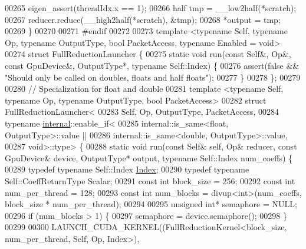 \begin{DoxyCode}
00265   eigen\_assert(threadIdx.x == 1);
00266   half tmp = \_\_low2half(*scratch);
00267   reducer.reduce(\_\_high2half(*scratch), &tmp);
00268   *output = tmp;
00269 \}
00270 
00271 \textcolor{preprocessor}{#endif}
00272 
00273 \textcolor{keyword}{template} <\textcolor{keyword}{typename} Self, \textcolor{keyword}{typename} Op, \textcolor{keyword}{typename} OutputType, \textcolor{keywordtype}{bool} PacketAccess, \textcolor{keyword}{typename} Enabled = \textcolor{keywordtype}{void}>
00274 \textcolor{keyword}{struct }FullReductionLauncher \{
00275   \textcolor{keyword}{static} \textcolor{keywordtype}{void} run(\textcolor{keyword}{const} Self&, Op&, \textcolor{keyword}{const} GpuDevice&, OutputType*, \textcolor{keyword}{typename} Self::Index) \{
00276     assert(\textcolor{keyword}{false} && \textcolor{stringliteral}{"Should only be called on doubles, floats and half floats"});
00277   \}
00278 \};
00279 
00280 \textcolor{comment}{// Specialization for float and double}
00281 \textcolor{keyword}{template} <\textcolor{keyword}{typename} Self, \textcolor{keyword}{typename} Op, \textcolor{keyword}{typename} OutputType, \textcolor{keywordtype}{bool} PacketAccess>
00282 \textcolor{keyword}{struct }FullReductionLauncher<
00283     Self, Op, OutputType, PacketAccess,
00284     typename \hyperlink{namespaceinternal}{internal}::enable\_if<
00285       internal::is\_same<float, OutputType>::value ||
00286       internal::is\_same<double, OutputType>::value,
00287     void>::type> \{
00288   \textcolor{keyword}{static} \textcolor{keywordtype}{void} run(\textcolor{keyword}{const} Self& \textcolor{keyword}{self}, Op& reducer, \textcolor{keyword}{const} GpuDevice& device, OutputType* output, \textcolor{keyword}{typename} 
      Self::Index num\_coeffs) \{
00289     \textcolor{keyword}{typedef} \textcolor{keyword}{typename} Self::Index \hyperlink{namespace_eigen_a62e77e0933482dafde8fe197d9a2cfde}{Index};
00290     \textcolor{keyword}{typedef} \textcolor{keyword}{typename} Self::CoeffReturnType Scalar;
00291     \textcolor{keyword}{const} \textcolor{keywordtype}{int} block\_size = 256;
00292     \textcolor{keyword}{const} \textcolor{keywordtype}{int} num\_per\_thread = 128;
00293     \textcolor{keyword}{const} \textcolor{keywordtype}{int} num\_blocks = divup<int>(num\_coeffs, block\_size * num\_per\_thread);
00294 
00295     \textcolor{keywordtype}{unsigned} \textcolor{keywordtype}{int}* semaphore = NULL;
00296     \textcolor{keywordflow}{if} (num\_blocks > 1) \{
00297       semaphore = device.semaphore();
00298     \}
00299 
00300     LAUNCH\_CUDA\_KERNEL((FullReductionKernel<block\_size, num\_per\_thread, Self, Op, Index>),

\end{DoxyCode}
